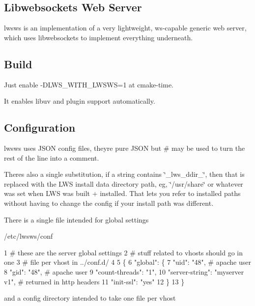 \subsection*{Libwebsockets Web Server }

lwsws is an implementation of a very lightweight, ws-\/capable generic web server, which uses libwebsockets to implement everything underneath.

\subsection*{Build }

Just enable -\/\+D\+L\+W\+S\+\_\+\+W\+I\+T\+H\+\_\+\+L\+W\+S\+WS=1 at cmake-\/time.

It enables libuv and plugin support automatically.

\subsection*{Configuration }

lwsws uses J\+S\+ON config files, they\textquotesingle{}re pure J\+S\+ON but \# may be used to turn the rest of the line into a comment.

There\textquotesingle{}s also a single substitution, if a string contains \char`\"{}\+\_\+lws\+\_\+ddir\+\_\+\char`\"{}, then that is replaced with the L\+WS install data directory path, eg, \char`\"{}/usr/share\char`\"{} or whatever was set when L\+WS was built + installed. That lets you refer to installed paths without having to change the config if your install path was different.

There is a single file intended for global settings

/etc/lwsws/conf 
\begin{DoxyCode}
1 # these are the server global settings
2 # stuff related to vhosts should go in one
3 # file per vhost in ../conf.d/
4 
5 \{
6   "global": \{
7    "uid": "48",  # apache user
8    "gid": "48",  # apache user
9    "count-threads": "1",
10    "server-string": "myserver v1", # returned in http headers
11    "init-ssl": "yes"
12  \}
13 \}
\end{DoxyCode}
 and a config directory intended to take one file per vhost

